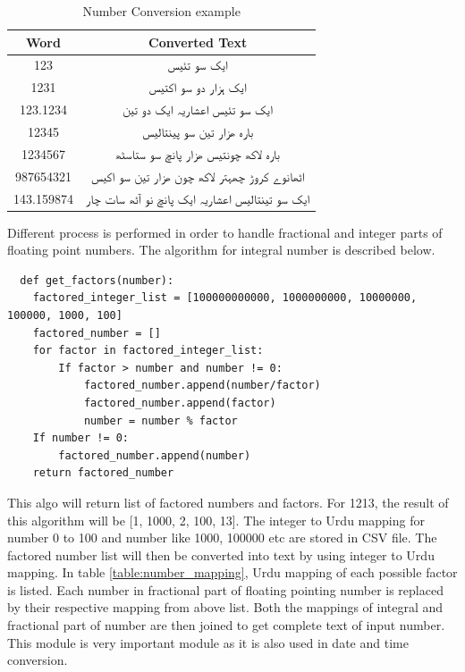 \begin{table}[]
\centering
\begin{tabular}{|c|c|}
\hline
\textbf{Word} & \textbf{Converted Text}                          \\ \hline
123           & \texturdu{ایک سو تئیس}                                     \\ \hline
1231          & \texturdu{ایک ہزار دو سو اکتیس}                            \\ \hline
123.1234      & \texturdu{ایک سو تئیس اعشاریہ ایک دو تین}                   \\ \hline
12345         & \texturdu{بارہ ھزار تین سو پینتالیس}                        \\ \hline
1234567       & \texturdu{بارہ لاکھ چونتیس ھزار پانچ سو ستاسٹھ}             \\ \hline
987654321     & \texturdu{اٹھانوے کروڑ  چھہتر لاکھ   چون ھزار تین سو اکیس}  \\ \hline
143.159874    & \texturdu{ایک سو تینتالیس  اعشاریہ ایک پانچ نو آٹھ سات چار} \\ \hline
\end{tabular}
\caption{Number Conversion example}
\label{table:no_conversion_example}
\end{table}

Different process is performed in order to handle fractional and integer parts of floating point numbers. The algorithm for integral number is described below.

\begin{verbatim}
  def get_factors(number):
    factored_integer_list = [100000000000, 1000000000, 10000000, 100000, 1000, 100]
    factored_number = []
    for factor in factored_integer_list:
        If factor > number and number != 0:
            factored_number.append(number/factor)
            factored_number.append(factor)
            number = number % factor  
    If number != 0:
        factored_number.append(number)
    return factored_number

\end{verbatim}

This algo will return list of factored numbers and factors. For 1213, the result of this algorithm will be 
[1, 1000, 2, 100, 13]. The integer to Urdu mapping for number 0 to 100 and number like 1000, 100000 etc are 
stored in CSV file. The factored number list will then be converted into text by using integer to Urdu mapping. 
In table \ref{table:number_mapping}, Urdu mapping of each possible factor is listed. Each number in fractional 
part of floating pointing number is replaced by their respective mapping from above list. 
Both the mappings of integral and fractional part of number are then joined to get
complete text of input number. This module is very important module as it is also used in date and time conversion.  

